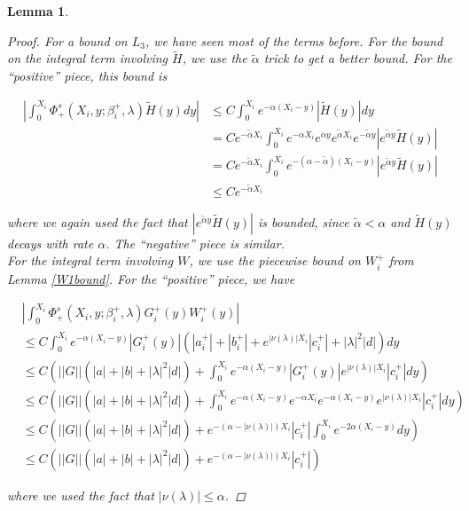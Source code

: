 \documentclass[12pt]{article}
\newtheorem{lemma}{Lemma}
\begin{document}
\begin{lemma}
\begin{proof}
For a bound on $L_3$, we have seen most of the terms before. For the bound on the integral term involving $\tilde{H}$, we use the $\tilde{\alpha}$ trick to get a better bound. For the ``positive'' piece, this bound is

\begin{align*}
\left| \int_0^{X_i} \Phi^s_+(X_i, y; \beta_i^+, \lambda) \tilde{H}(y) dy \right| 
&\leq C \int_0^{X_i} e^{-\alpha (X_i - y)}|\tilde{H}(y)| dy \\
&= C e^{-\tilde{\alpha}X_i} \int_0^{X_i} e^{-\alpha X_i} e^{\alpha y}  e^{\tilde{\alpha}X_i} e^{-\tilde{\alpha}y} |e^{\tilde{\alpha}y} \tilde{H}(y)| \\
&= C e^{-\tilde{\alpha}X_i} \int_0^{X_i} e^{-(\alpha - \tilde{\alpha})(X_i-y)} |e^{\tilde{\alpha}y} \tilde{H}(y)|\\
&\leq C e^{-\tilde{\alpha}X_i} 
\end{align*}

where we again used the fact that $|e^{\tilde{\alpha}y} \tilde{H}(y)|$ is bounded, since $\tilde{\alpha} < \alpha$ and $\tilde{H}(y)$ decays with rate $\alpha$. The ``negative'' piece is similar.\\

For the integral term involving $W$, we use the piecewise bound on $W_i^+$ from Lemma \ref{W1bound}. For the ``positive'' piece, we have

\begin{align*}
&\left| \int_0^{X_i} \Phi^s_+(X_i, y; \beta_i^+, \lambda) G_i^+(y) W_i^+(y) \right| \\
&\leq C \int_0^{X_i} e^{-\alpha(X_i - y)}|G_i^+(y)|(|a_i^+| + |b_i^+| + e^{|\nu(\lambda)|X_i}|c_i^+| + |\lambda|^2 |d| ) dy \\
&\leq C \left( ||G||(|a| + |b| + |\lambda|^2 |d|) + \int_0^{X_i} e^{-\alpha(X_i - y)}|G_i^+(y)|e^{|\nu(\lambda)|X_i}|c_i^+| dy \right) \\
&\leq C \left( ||G||(|a| + |b| + |\lambda|^2 |d|) + \int_0^{X_i} e^{-\alpha(X_i - y)}e^{-\alpha X_i} e^{-\alpha(X_i - y)} e^{|\nu(\lambda)|X_i}|c_i^+| dy \right)\\
&\leq C \left( ||G||(|a| + |b| + |\lambda|^2 |d|) + e^{-(\alpha - |\nu(\lambda)|)X_i} |c_i^+| \int_0^{X_i} e^{-2\alpha(X_i - y)} dy \right) \\
&\leq C \left( ||G||(|a| + |b| + |\lambda|^2 |d|) + e^{-(\alpha - |\nu(\lambda)|)X_i} |c_i^+| \right)
\end{align*}

where we used the fact that $|\nu(\lambda)| \leq \alpha$.  


\end{proof}
\end{lemma}
\end{document}
